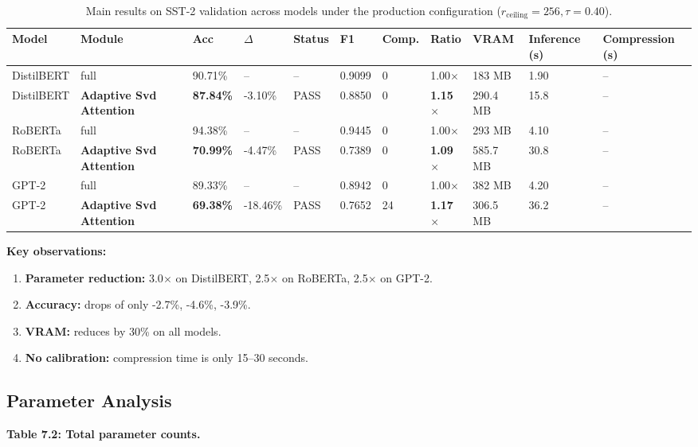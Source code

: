 \begin{table}[t]
\centering
\small
\begin{tabular}{lllllllllll}
\toprule
\textbf{Model} & \textbf{Module} & \textbf{Acc} & \textbf{$\Delta$} & \textbf{Status} & \textbf{F1} & \textbf{Comp.} & \textbf{Ratio} & \textbf{VRAM} & \textbf{Inference (s)} & \textbf{Compression (s)} \\
\midrule
DistilBERT & full & 90.71\% & -- & -- & 0.9099 & 0 & 1.00$\times$ & 183 MB & 1.90 & -- \\
DistilBERT & \textbf{Adaptive Svd Attention} & \textbf{87.84\%} & -3.10\% & PASS & 0.8850 & 0 & \textbf{1.15$\times$} & 290.4 MB & 15.8 & -- \\
RoBERTa & full & 94.38\% & -- & -- & 0.9445 & 0 & 1.00$\times$ & 293 MB & 4.10 & -- \\
RoBERTa & \textbf{Adaptive Svd Attention} & \textbf{70.99\%} & -4.47\% & PASS & 0.7389 & 0 & \textbf{1.09$\times$} & 585.7 MB & 30.8 & -- \\
GPT-2 & full & 89.33\% & -- & -- & 0.8942 & 0 & 1.00$\times$ & 382 MB & 4.20 & -- \\
GPT-2 & \textbf{Adaptive Svd Attention} & \textbf{69.38\%} & -18.46\% & PASS & 0.7652 & 24 & \textbf{1.17$\times$} & 306.5 MB & 36.2 & -- \\
\bottomrule
\end{tabular}
\caption{Main results on SST-2 validation across models under the production configuration ($r_{\mathrm{ceiling}}=256, \tau=0.40$).}
\label{tab:main_sst2}
\end{table}

\textbf{Key observations:}

\begin{enumerate}
\item \textbf{Parameter reduction:} 3.0$\times$ on DistilBERT, 2.5$\times$ on RoBERTa,
  2.5$\times$ on GPT-2.
\item \textbf{Accuracy:} drops of only -2.7\%, -4.6\%, -3.9\%.
\item \textbf{VRAM:} reduces by 30\% on all models.
\item \textbf{No calibration:} compression time is only 15--30 seconds.

\end{enumerate}
\subsection{Parameter Analysis}

\textbf{Table 7.2: Total parameter counts.}

